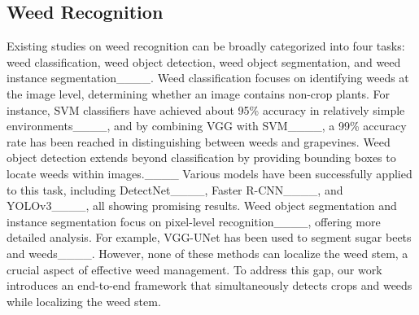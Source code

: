 \subsection{Weed Recognition}
Existing studies on weed recognition can be broadly categorized into four tasks: weed classification, weed object detection, weed object segmentation, and weed instance segmentation____. Weed classification focuses on identifying weeds at the image level, determining whether an image contains non-crop plants. For instance, SVM classifiers have achieved about 95\% accuracy in relatively simple environments____, and by combining VGG with 
SVM____, a 99\% accuracy rate has been reached in distinguishing between weeds and grapevines. Weed object detection extends beyond classification by providing bounding boxes to locate weeds within images.____ Various models have been successfully applied to this task, including DetectNet____, Faster R-CNN____, and YOLOv3____, all showing promising results. Weed object segmentation and instance segmentation focus on pixel-level recognition____, offering more detailed analysis. For example, VGG-UNet has been used to segment sugar beets and weeds____. 
However, none of these methods can localize the weed stem, a crucial aspect of effective weed management. To address this gap, our work introduces an end-to-end framework that simultaneously detects crops and weeds while localizing the weed stem.

